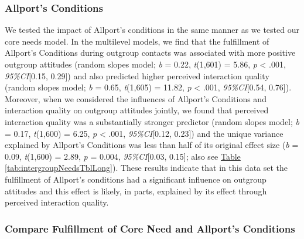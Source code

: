 \documentclass[man, 12pt, a4paper, mask]{apa7}
\theoremstyle{break}
\theoremstyle{plain}
\newcommand{\tblref}[2][]{\hyperref[#2]{Table \ref*{#2}#1}}
\begin{document}
\subsubsection{Allport's Conditions}

We tested the impact of Allport's conditions in the same manner as we
tested our core needs model. In the multilevel models, we find that the
fulfillment of Allport's Conditions during outgroup contacts was
associated with more positive outgroup attitudes (random slopes model;
\textit{b} = 0.22, \textit{t}(1,601) = 5.86, \textit{p} \textless{}
.001, \textit{95\%CI}{[}0.15, 0.29{]}) and also predicted higher
perceived interaction quality (random slopes model; \textit{b} = 0.65,
\textit{t}(1,605) = 11.82, \textit{p} \textless{} .001,
\textit{95\%CI}{[}0.54, 0.76{]}). Moreover, when we considered the
influences of Allport's Conditions and interaction quality on outgroup
attitudes jointly, we found that perceived interaction quality was a
substantially stronger predictor (random slopes model; \textit{b} =
0.17, \textit{t}(1,600) = 6.25, \textit{p} \textless{} .001,
\textit{95\%CI}{[}0.12, 0.23{]}) and the unique variance explained by
Allport's Conditions was less than half of its original effect size
(\textit{b} = 0.09, \textit{t}(1,600) = 2.89, \textit{p} = 0.004,
\textit{95\%CI}{[}0.03, 0.15{]}; also see
\tblref{tab:intergroupNeedsTblLong}). These results indicate that in
this data set the fulfillment of Allport's conditions had a significant
influence on outgroup attitudes and this effect is likely, in parts,
explained by its effect through perceived interaction quality.

\subsubsection{Compare Fulfillment of Core Need and Allport's Conditions}
\end{document}
